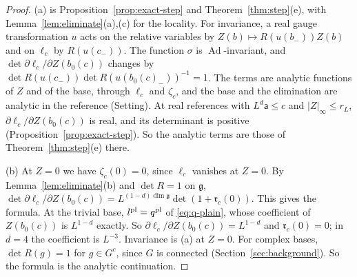 \begin{proof}
(a) is Proposition~\ref{prop:exact-step} and Theorem~\ref{thm:step}(e), with Lemma~\ref{lem:eliminate}(a),(c) for the locality. For invariance, a real gauge transformation $u$ acts on the relative variables by $Z(b)\mapsto R(u(b_-))Z(b)$ and on $\ell_c$ by $R(u(c_-))$. The function $\sigma$ is $\operatorname{Ad}$-invariant, and $\det\partial\ell_c/\partial Z(b_0(c))$ changes by $\det R(u(c_-))\det R(u(b_0(c)_-))^{-1}=1$. The terms are analytic functions of $Z$ and of the base, through $\ell_c$ and $\zeta_c$, and the base and the elimination are analytic in the reference (Setting). At real references with $L^d\mathsf a\le c$ and $|Z|_\infty\le r_L$, $\partial\ell_c/\partial Z(b_0(c))$ is real, and its determinant is positive (Proposition~\ref{prop:exact-step}). So the analytic terms are those of Theorem~\ref{thm:step}(e) there.

(b) At $Z=0$ we have $\zeta_c(0)=0$, since $\ell_c$ vanishes at $Z=0$. By Lemma~\ref{lem:eliminate}(b) and $\det R=1$ on $\mathfrak g$, $\det\partial\ell_c/\partial Z(b_0(c))=L^{(1-d)\dim\mathfrak g}\det(1+\mathfrak r_c(0))$. This gives the formula. At the trivial base, $l^{\rm pl}=q^{\rm pl}$ of \eqref{eq:q-plain}, whose coefficient of $Z(b_0(c))$ is $L^{1-d}$ exactly. So $\partial\ell_c/\partial Z(b_0(c))=L^{1-d}$ and $\mathfrak r_c(0)=0$; in $d=4$ the coefficient is $L^{-3}$. Invariance is (a) at $Z=0$. For complex bases, $\det R(g)=1$ for $g\in G^c$, since $G$ is connected (Section~\ref{sec:background}). So the formula is the analytic continuation.


\end{proof}
